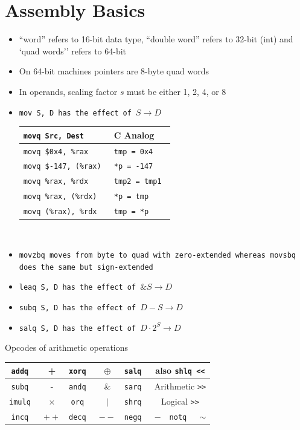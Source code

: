 \section{Assembly Basics}
\begin{itemize}[noitemsep, topsep=1pt]
    \item ``word'' refers to 16-bit data type, ``double word'' refers to 32-bit (int) and `quad words'' refers to 64-bit
    \item On 64-bit machines pointers are 8-byte quad words
    \item In operands, scaling factor $s$ must be either 1, 2, 4, or 8
    \item \tt{mov S, D} has the effect of $S \to D$
    
    \begin{tabular}{| l || l |} \hline
        \tt{movq Src, Dest} & C Analog \\ \hline
        \tt{movq \$0x4, \%rax} & \tt{tmp = 0x4} \\ \hline
        \tt{movq \$-147, (\%rax)} & \tt{*p = -147} \\ \hline
        \tt{movq \%rax, \%rdx} & \tt{tmp2 = tmp1} \\ \hline
        \tt{movq \%rax, (\%rdx)} & \tt{*p = tmp} \\ \hline
        \tt{movq (\%rax), \%rdx} & \tt{tmp = *p} \\ \hline
    \end{tabular} \\
    \item \tt{movzbq} moves from byte to quad with zero-extended whereas \tt{movsbq} does the same but sign-extended
    \item \tt{leaq S, D} has the effect of $\&S \to D$
    \item \tt{subq S, D} has the effect of $D - S \to D$
    \item \tt{salq S, D} has the effect of $D \cdot 2^S \to D$
\end{itemize}
\begin{center}
    Opcodes of arithmetic operations
    \begin{tabular}{| c|c || c|c || c|c | c|c |} \hline
        \tt{addq} & + & \tt{xorq} & $\oplus$ & \tt{salq} & \multicolumn{3}{|c|}{also \tt{shlq} \tt{<<}} \\ \hline
        \tt{subq} & - & \tt{andq} & \& & \tt{sarq} & \multicolumn{3}{|c|}{Arithmetic \tt{>>}} \\ \hline
        \tt{imulq} & $\times$ & \tt{orq} & $|$ & \tt{shrq} & \multicolumn{3}{|c|}{Logical \tt{>>}} \\ \hline
        \tt{incq} & $++$ & \tt{decq} & $--$ & \tt{negq} & $-$ & \tt{notq} & $\sim$ \\ \hline
    \end{tabular}\\
\end{center}
